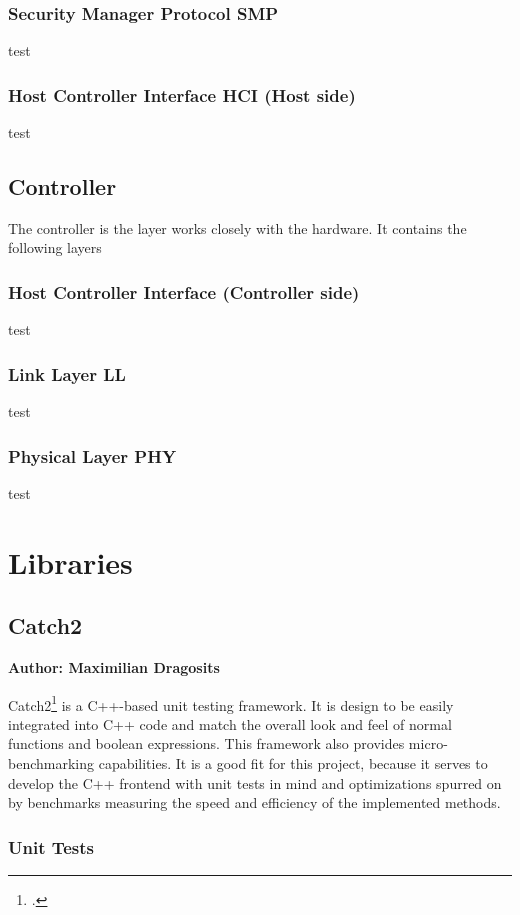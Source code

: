 \subsubsection{Security Manager Protocol SMP}
test

\subsubsection{Host Controller Interface HCI (Host side)}
test

\subsection{Controller}
The controller is the layer works closely with the hardware. It contains the following layers

\subsubsection{Host Controller Interface (Controller side)}
test
\subsubsection{Link Layer LL}
test
\subsubsection{Physical Layer PHY}
test

\section{Libraries}

\subsection{Catch2}
\textbf{Author: Maximilian Dragosits}

Catch2\footcite{catch2_main_site} is a C++-based unit testing framework. It is design to be easily integrated into C++ code and match the overall look and feel
of normal functions and boolean expressions. This framework also provides micro-benchmarking capabilities. It is a good fit for this project, because it serves
to develop the C++ frontend with unit tests in mind and optimizations spurred on by benchmarks measuring the speed and efficiency of the implemented methods.

\subsubsection{Unit Tests}

